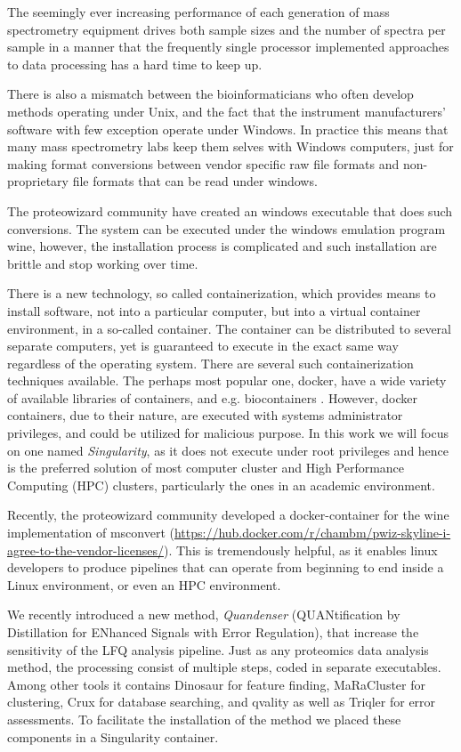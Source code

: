 \documentclass[11pt]{article}
\begin{document}
The seemingly ever increasing performance of each generation of mass spectrometry equipment drives both sample sizes and the number of spectra per sample in a manner that the frequently single processor implemented approaches to data processing has a hard time to keep up.

There is also a mismatch between the bioinformaticians who often develop methods operating under Unix, and the fact that the instrument manufacturers' software with few exception operate under Windows. In practice this means that many mass spectrometry labs keep them selves with Windows computers, just for making format conversions between vendor specific raw file formats and non-proprietary file formats that can be read under windows.

The proteowizard community have created an windows executable that does such conversions. The system can be executed under the windows emulation program wine, however, the installation process is complicated and such installation are brittle and stop working over time.

There is a new technology, so called containerization, which provides means to install software, not into a particular computer, but into a virtual container environment, in a so-called container. The container can be distributed to several separate computers, yet is guaranteed to execute in the exact same way regardless of the operating system. There are several such containerization techniques available. The perhaps most popular one, docker, have a wide variety of available libraries of containers, and e.g. biocontainers \cite{biocontainers}. However, docker containers, due to their nature, are executed with systems administrator privileges, and could be utilized for malicious purpose.  In this work we will focus on one named \textit{Singularity}, as it does not execute under root privileges and hence is the preferred solution of most computer cluster and High Performance Computing (HPC) clusters, particularly the ones in an academic environment.

Recently, the proteowizard community developed a docker-container for the wine implementation of msconvert (\url{https://hub.docker.com/r/chambm/pwiz-skyline-i-agree-to-the-vendor-licenses/}). This is tremendously helpful, as it enables linux developers to produce pipelines that can operate from beginning to end inside a Linux environment, or even an HPC environment.

We recently introduced a new method, {\em Quandenser} (QUANtification by Distillation for ENhanced Signals with Error Regulation), that increase the sensitivity of the LFQ analysis pipeline. Just as any proteomics data analysis method, the processing consist of multiple steps, coded in separate executables. Among other tools it contains Dinosaur\cite{teleman2016dinosaur} for feature finding, MaRaCluster\cite{the2016maracluster} for clustering, Crux\cite{mcilwain2014} for database searching, and qvality\cite{kall2008non} as well as Triqler\cite{the2018integrated} for error assessments. To facilitate the installation of the method we placed these components in a Singularity container.
\end{document}

